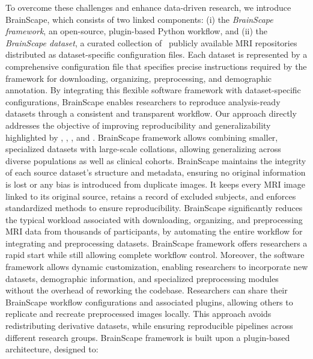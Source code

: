 To overcome these challenges and enhance data-driven research, we introduce BrainScape,
which consists of two linked components: 
(i) the \emph{BrainScape framework}, an open-source, plugin-based Python workflow, and 
(ii) the \emph{BrainScape dataset}, a curated collection of \NumDatasets\ publicly available MRI repositories distributed as dataset-specific configuration files.
Each dataset is represented by a comprehensive configuration file that specifies precise instructions 
required by the framework for downloading, organizing, preprocessing, and demographic annotation. 
By integrating this flexible software framework with dataset-specific configurations, 
BrainScape enables researchers to reproduce analysis-ready datasets through a consistent and transparent workflow.
Our approach directly addresses the objective of improving reproducibility and 
generalizability highlighted by \cite{marek2024replicability}, \cite{yang2024limits}, \cite{kiar2024experimental}, and \cite{adkinson2024brain}.
BrainScape framework allows combining smaller, specialized datasets with large-scale collations, 
allowing generalizing across diverse populations as well as clinical cohorts. 
BrainScape maintains the integrity of each source dataset's structure and metadata, ensuring no original information is lost or any bias is introduced from duplicate images. 
It keeps every MRI image linked to its original source, retains a record of excluded subjects, 
and enforces standardized methods to ensure reproducibility. 
BrainScape significantly reduces the typical workload associated with downloading, 
organizing, and preprocessing MRI data from thousands of participants, 
by automating the entire workflow for integrating and preprocessing datasets. 
BrainScape framework offers researchers a rapid start while still allowing complete workflow control.
Moreover, the software framework allows dynamic customization, enabling researchers to incorporate new datasets, demographic information, 
and specialized preprocessing modules without the overhead of reworking the codebase.
Researchers can share their BrainScape workflow configurations and associated plugins, 
allowing others to replicate and recreate preprocessed images locally. 
This approach avoids redistributing derivative datasets, 
while ensuring reproducible pipelines across different research groups. 
BrainScape framework is built upon a plugin-based architecture, designed to:

